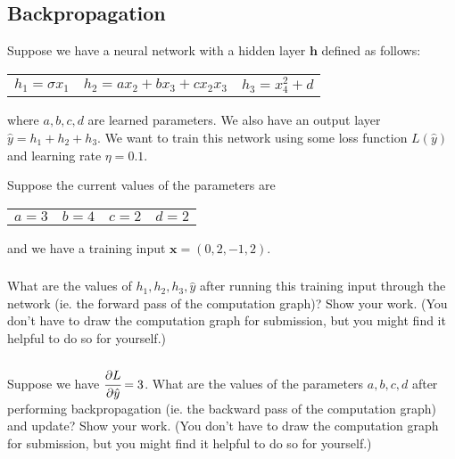 \documentclass[12pt,a4paper]{article}
\begin{document}
\pagebreak

\subsection{Backpropagation}

Suppose we have a neural network with a hidden layer $\mathbf{h}$ defined as follows:
\begin{center}
\begin{tabular}{l l l}
$h_1 = \sigma{x_1}$ & $h_2 = a x_2 + b x_3 + c x_2 x_3$ & $h_3 = x_4^2 + d$ \\
\end{tabular}
\end{center}

where $a, b, c, d$ are learned parameters. We also have an output layer $\hat{y} = h_1 + h_2 + h_3$. We want to train this network using some loss function $L(\hat{y})$ and learning rate $\eta = 0.1$.

Suppose the current values of the parameters are
\begin{center}
\begin{tabular}{l l l l}
$a = 3$ & $b = 4$ & $c = 2$ & $d = 2$ \\
\end{tabular}
\end{center}

and we have a training input $\mathbf{x} = (0, 2, -1, 2)$.

\subsubsection{}

What are the values of $h_1, h_2, h_3, \hat{y}$ after running this training input through the network (ie. the forward pass of the computation graph)? Show your work. (You don't have to draw the computation graph for submission, but you might find it helpful to do so for yourself.)

\subsubsection{}

Suppose we have $\cfrac{\partial L}{\partial \hat{y}} = 3$. What are the values of the parameters $a, b, c, d$ after performing backpropagation (ie. the backward pass of the computation graph) and update? Show your work. (You don't have to draw the computation graph for submission, but you might find it helpful to do so for yourself.)
\end{document}
